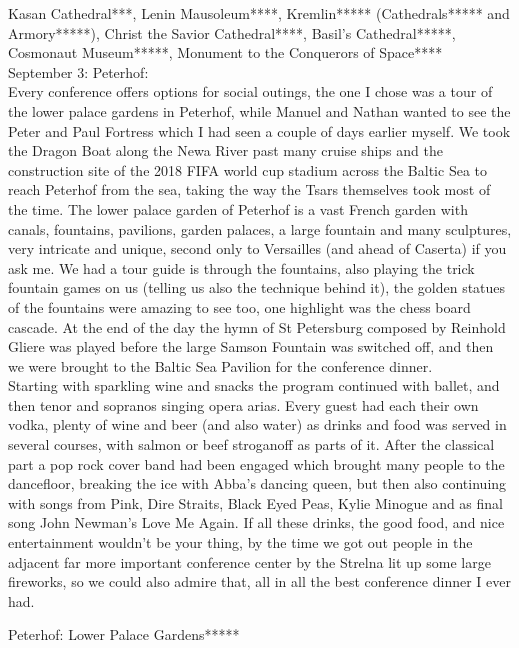 Kasan Cathedral***, Lenin Mausoleum****, Kremlin***** (Cathedrals***** and Armory*****), Christ the Savior Cathedral****, Basil's Cathedral*****, Cosmonaut Museum*****, Monument to the Conquerors of Space****\\

September 3: Peterhof:\\
Every conference offers options for social outings, the one I chose was a tour of the lower palace gardens in Peterhof, while Manuel and Nathan wanted to see the Peter and Paul Fortress which I had seen a couple of days earlier myself. We took the Dragon Boat along the Newa River past many cruise ships and the construction site of the 2018 FIFA world cup stadium across the Baltic Sea to reach Peterhof from the sea, taking the way the Tsars themselves took most of the time. The lower palace garden of Peterhof is a vast French garden with canals, fountains, pavilions, garden palaces, a large fountain and many sculptures, very intricate and unique, second only to Versailles (and ahead of Caserta) if you ask me. We had a tour guide is through the fountains, also playing the trick fountain games on us (telling us also the technique behind it), the golden statues of the fountains were amazing to see too, one highlight was the chess board cascade. At the end of the day the hymn of St Petersburg composed by Reinhold Gliere was played before the large Samson Fountain was switched off, and then we were brought to the Baltic Sea Pavilion for the conference dinner. \\
Starting with sparkling wine and snacks the program continued with ballet, and then tenor and sopranos singing opera arias. Every guest had each their own vodka, plenty of wine and beer (and also water) as drinks and food was served in several courses, with salmon or beef stroganoff as parts of it. After the classical part a pop rock cover band had been engaged which brought many people to the dancefloor, breaking the ice with Abba's dancing queen, but then also continuing with songs from Pink, Dire Straits, Black Eyed Peas, Kylie Minogue and as final song John Newman's Love Me Again. If all these drinks, the good food, and nice entertainment wouldn't be your thing, by the time we got out people in the adjacent far more important conference center by the Strelna lit up some large fireworks, so we could also admire that, all in all the best conference dinner I ever had.

Peterhof: Lower Palace Gardens*****\\

